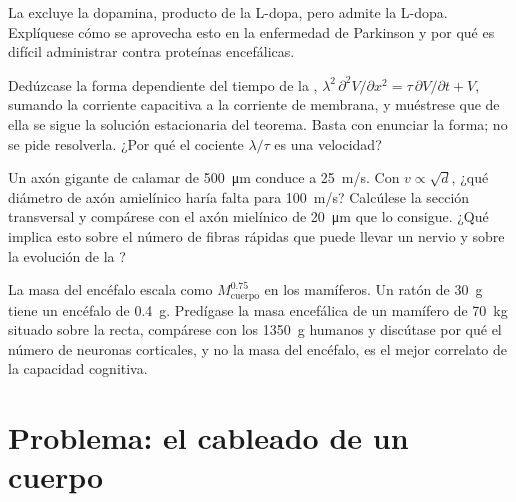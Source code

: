 \begin{exercise}[$\star\star$]\label{exo:b3:nervous-systems:9}
La  excluye la dopamina, producto de la L-dopa,
pero admite la L-dopa. Explíquese cómo se aprovecha esto en la
enfermedad de Parkinson y por qué es difícil administrar 
contra proteínas encefálicas.
\end{exercise}

\begin{exercise}[$\star\star\star$]\label{exo:b3:nervous-systems:10}
Dedúzcase la forma dependiente del tiempo de la , $\lambda^{2}\,\partial^{2}
V/\partial x^{2} = \tau\,\partial V/\partial t + V$, sumando la
corriente capacitiva a la corriente de membrana, y muéstrese que de
ella se sigue la solución estacionaria del teorema. Basta con enunciar
la forma; no se pide resolverla. ¿Por qué el cociente $\lambda/\tau$ es
una velocidad?
\end{exercise}

\begin{exercise}[$\star\star\star$]\label{exo:b3:nervous-systems:11}
Un axón gigante de calamar de \qty{500}{\micro m} conduce a
\qty{25}{m/s}. Con $v \propto \sqrt{d}$, ¿qué diámetro de axón
amielínico haría falta para \qty{100}{m/s}? Calcúlese la sección
transversal y compárese con el axón mielínico de \qty{20}{\micro m} que
lo consigue. ¿Qué implica esto sobre el número de fibras rápidas que
puede llevar un nervio y sobre la evolución de la ?
\end{exercise}

\begin{exercise}[$\star\star\star$]\label{exo:b3:nervous-systems:12}
La masa del encéfalo escala como $M_{\text{cuerpo}}^{0.75}$ en los
mamíferos. Un ratón de \qty{30}{g} tiene un encéfalo de \qty{0.4}{g}.
Predígase la masa encefálica de un mamífero de \qty{70}{kg} situado
sobre la recta, compárese con los \qty{1350}{g} humanos y discútase por
qué el número de neuronas corticales, y no la masa del encéfalo, es el
mejor correlato de la capacidad cognitiva.
\end{exercise}

\section{Problema: el cableado de un cuerpo}

